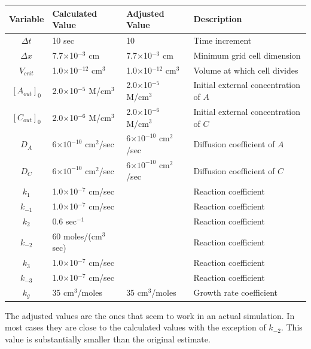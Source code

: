 \documentclass[12pt]{article}
\begin{document}
\begin{tabular}{|c|l|l|l|}
\hline
Variable & Calculated Value & Adjusted Value & Description \\
\hline
$\Delta t$ & 10 sec & 10 & Time increment \\
$\Delta x$ & 7.7$\times$10$^{-3}$ cm & 7.7$\times$10$^{-3}$ cm& Minimum grid cell dimension \\
$V_{crit}$ & 1.0$\times$10$^{-12}$ cm$^3$ & 1.0$\times$10$^{-12}$ cm$^3$
    &  Volume at which cell divides \\
$[A_{out}]_0$ & 2.0$\times$10$^{-5}$ M/cm$^3$ & 2.0$\times$10$^{-5}$ M/cm$^3$
    & Initial external concentration of $A$ \\
$[C_{out}]_0$ & 2.0$\times$10$^{-6}$ M/cm$^3$ & 2.0$\times$10$^{-6}$ M/cm$^3$
    & Initial external concentration of $C$ \\
$D_A$ & 6$\times 10^{-10}$ cm$^2$/sec & 6$\times 10^{-10}$ cm$^2$/sec & Diffusion coefficient of $A$ \\
$D_C$ & 6$\times 10^{-10}$ cm$^2$/sec & 6$\times 10^{-10}$ cm$^2$/sec & Diffusion coefficient of $C$ \\
$k_1$ & 1.0$\times$10$^{-7}$ cm/sec &\color{red}{2.0$\times$10$^{-5}$ cm/sec} & Reaction coefficient \\
$k_{-1}$ & 1.0$\times$10$^{-7}$ cm/sec &\color{red}{2.0$\times$10$^{-5}$ cm/sec} & Reaction coefficient \\
$k_2$ & 0.6 sec$^{-1}$ &\color{red}{0.4 sec$^{-1}$} & Reaction coefficient \\
$k_{-2}$ & 60 moles/(cm$^3$ sec) &\color{red}{0.06 moles/(cm$^3$ sec)} & Reaction coefficient \\
$k_3$ & 1.0$\times$10$^{-7}$ cm/sec &\color{red}{2.0$\times$10$^{-5}$ cm/sec} & Reaction coefficient \\
$k_{-3}$ & 1.0$\times$10$^{-7}$ cm/sec &\color{red}{2.0$\times$10$^{-5}$ cm/sec} & Reaction coefficient \\
$k_g$ & 35 cm$^3$/moles & 35 cm$^3$/moles & Growth rate coefficient \\
\hline
\end{tabular}

\noindent
The adjusted values are the ones that seem to work in an actual simulation. In most cases they are close
to the calculated values with the exception of $k_{-2}$. This value is substantially smaller than the
original estimate.
\end{document}
